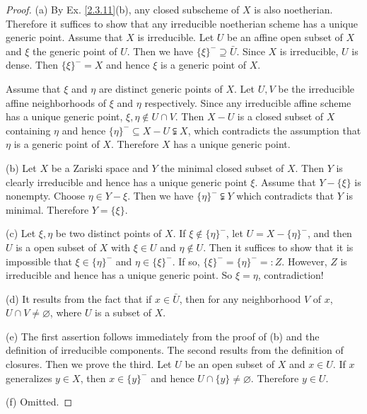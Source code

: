 \begin{proof}
	(a) By Ex. \ref{2.3.11}(b), any closed subscheme of $X$ is also noetherian. Therefore it suffices to show that any irreducible noetherian scheme has a unique generic point. Assume that $X$ is irreducible. Let $U$ be an affine open subset of $X$ and $\xi$ the generic point of $U$. Then we have $\{\xi\}^-\supseteq\bar{U}$. Since $X$ is irreducible, $U$ is dense. Then $\{\xi\}^-=X$ and hence $\xi$ is a generic point of $X$.
	
	Assume that $\xi$ and $\eta$ are distinct generic points of $X$. Let $U,V$ be the irreducible affine neighborhoods of $\xi$ and $\eta$ respectively. Since any irreducible affine scheme has a unique generic point, $\xi,\eta\notin U\cap V$. Then $X-U$ is a closed subset of $X$ containing $\eta$ and hence $\{\eta\}^-\subseteq X-U\subsetneqq X$, which contradicts the assumption that $\eta$ is a generic point of $X$. Therefore $X$ has a unique generic point.
	
	(b) Let $X$ be a Zariski space and $Y$ the minimal closed subset of $X$. Then $Y$ is clearly irreducible and hence has a unique generic point $\xi$. Assume that $Y-\{\xi\}$ is nonempty. Choose $\eta\in Y-\xi$. Then we have $\{\eta\}^-\subsetneqq Y$ which contradicts that $Y$ is minimal. Therefore $Y=\{\xi\}$.
	
	(c) Let $\xi,\eta$ be two distinct points of $X$. If $\xi\notin\{\eta\}^-$, let $U=X-\{\eta\}^-$, and then $U$ is a open subset of $X$ with $\xi\in U$ and $\eta\notin U$. Then it suffices to show that it is impossible that $\xi\in\{\eta\}^-$ and $\eta\in\{\xi\}^-$. If so, $\{\xi\}^-=\{\eta\}^-=:Z$. However, $Z$ is irreducible and hence has a unique generic point. So $\xi=\eta$, contradiction!
	
	(d) It results from the fact that if $x\in\bar{U}$, then for any neighborhood $V$ of $x$, $U\cap V\neq\varnothing$, where $U$ is a subset of $X$.
	
	(e) The first assertion follows immediately from the proof of (b) and the definition of irreducible components. The second results from the definition of closures. Then we prove the third. Let $U$ be an open subset of $X$ and $x\in U$. If $x$ generalizes $y\in X$, then $x\in\{y\}^-$ and hence $U\cap\{y\}\neq\varnothing$. Therefore $y\in U$.
	
	(f) Omitted.
\end{proof}
